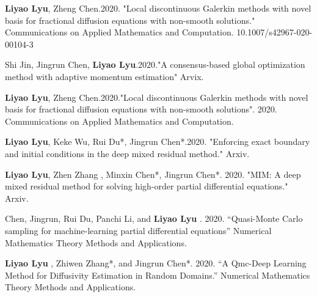 \documentclass[a4paper,10pt,utf8]{article} %
\begin{document}
\begin{small}
\textbf{Liyao Lyu}, Zheng Chen.2020. "Local discontinuous Galerkin methods with novel basis for fractional diffusion equations with non-smooth solutions." Communications on Applied Mathematics and Computation. 10.1007/s42967-020-00104-3

Shi Jin, Jingrun Chen, \textbf{Liyao Lyu}.2020."A consensus-based global optimization method with adaptive momentum estimation" Arvix.

\textbf{Liyao Lyu}, Zheng Chen.2020."Local discontinuous Galerkin methods with novel basis for fractional diffusion equations with non-smooth solutions". 2020.
	Communications on Applied Mathematics and Computation.

\textbf{Liyao Lyu}, Keke Wu, Rui Du*, Jingrun Chen*.2020.
"Enforcing exact boundary and initial conditions in the deep mixed residual method." Arxiv.

\textbf{Liyao Lyu}, Zhen Zhang , Minxin Chen*, Jingrun Chen*. 2020. "MIM: A deep mixed residual method for solving high-order partial differential equations." Arxiv. 

Chen, Jingrun, Rui Du, Panchi Li, and \textbf{Liyao Lyu} . 2020. “Quasi-Monte Carlo sampling for machine-learning partial differential equations” Numerical Mathematics Theory Methods and Applications. 

\textbf{Liyao Lyu} , Zhiwen Zhang*, and Jingrun Chen*. 2020. “A Qmc-Deep Learning Method for Diffusivity Estimation in Random Domains.” Numerical Mathematics Theory Methods and Applications. 


\end{small}
\end{document}
